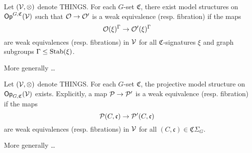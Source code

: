 \documentclass[a4paper,10pt
,draft
]{article}%
\newcommand{\UC}{\underline{\mathfrak C}}
\renewcommand{\1}{\ensuremath{\mathbb{id}}}
\begin{document}

\begin{theorem}
      \label{THM1_C}
      Let $(\V,\otimes)$ denote {\color{red} THINGS}.
      For each $G$-set $\mathfrak C$,
      there exist model structures on $\Op^{G, \mathfrak C}(\V)$ such that
      $\O \to \O'$ is a weak equivalence (resp. fibration) if the maps
      \begin{equation}
            \O(\xi)^\Gamma \to \O'(\xi)^\Gamma
      \end{equation}
      are weak equivalences (resp. fibrations) in $\V$ for all
      $\mathfrak C$-signatures $\xi$ and
      graph subgroups $\Gamma \leq \Stab(\xi)$.

      {\color{red} More generally \ldots}
\end{theorem}


\begin{theorem}
      \label{THM2_C}
      Let $(\V,\otimes)$ denote {\color{red} THINGS}.
      For each $G$-set $\mathfrak C$,
      the projective model structure on $\Op_{G, \mathfrak C}(\V)$ exists.
      Explicitly, a map
      $\P \to \P'$ is a weak equivalence (resp. fibration) if the maps
      \begin{equation}
            \P(C,\mathfrak c) \to \P'(C, \mathfrak c)
      \end{equation}
      are weak equivalences (resp. fibrations) in $\V$ for all
      $(C,\mathfrak c) \in \UC\Sigma_G$.

      {\color{red} More generally \ldots}
\end{theorem}
\end{document}
